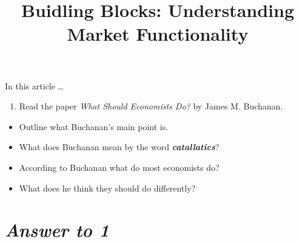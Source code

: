 \documentclass[11pt,]{article}
\title{Buidling Blocks: Understanding Market Functionality  }
\author{\Large \vspace{0.05in} \newline\normalsize\emph{}  }
\date{}
\newcommand*{\authorfont}{\fontfamily{phv}\selectfont}
\renewenvironment{abstract}
 {{%
    \setlength{\leftmargin}{0mm}
    \setlength{\rightmargin}{\leftmargin}%
  }%
  \relax}
 {\endlist}
\begin{document}
	
%

{%
\setlength{\parindent}{0pt}
\thispagestyle{plain}
{\fontsize{18}{20}\selectfont\raggedright 
\maketitle  %

}

{
   \vskip 13.5pt\relax \normalsize\fontsize{11}{12} 
\textbf{\authorfont } \hskip 15pt \emph{\small }   

}

}







\begin{abstract}

    \hbox{\vrule height .2pt width 39.14pc}

    \vskip 8.5pt %

\noindent In this article \ldots{}


    \hbox{\vrule height .2pt width 39.14pc}


\end{abstract}


\vskip 6.5pt

\noindent \doublespacing \begin{enumerate}
\def\labelenumi{\arabic{enumi}.}
\tightlist
\item
  Read the paper \emph{What Should Economists Do?} by James M. Buchanan.
\end{enumerate}

\begin{itemize}
\tightlist
\item
  Outline what Buchanan's main point is.
\item
  What does Buchanan mean by the word \textbf{\emph{catallatics}}?
\item
  According to Buchanan what do most economists do?
\item
  What does he think they should do differently?
\end{itemize}

\section{\texorpdfstring{\emph{Answer to
1}}{Answer to 1}}\label{answer-to-1}
\end{document}

